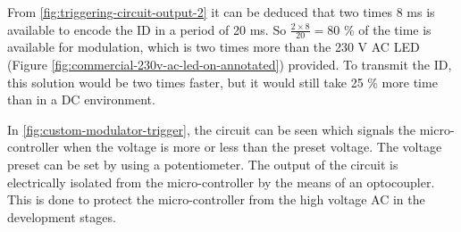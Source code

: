 	From \autoref{fig:triggering-circuit-output-2} it can be deduced that two times 8 ms is available to encode the ID in a period of 20 ms.
	So $\frac{2 \times 8}{20} = 80$ \% of the time is available for modulation, which is two times more than the 230 V AC LED (Figure \ref{fig:commercial-230v-ac-led-on-annotated}) provided.
	To transmit the ID, this solution would be two times faster, but it would still take 25 \% more time than in a DC environment.



	In \autoref{fig:custom-modulator-trigger}, the circuit can be seen which signals the micro-controller when the voltage is more or less than the preset voltage. 
	The voltage preset can be set by using a potentiometer.
	The output of the circuit is electrically isolated from the micro-controller by the means of an optocoupler.
	This is done to protect the micro-controller from the high voltage AC in the development stages.